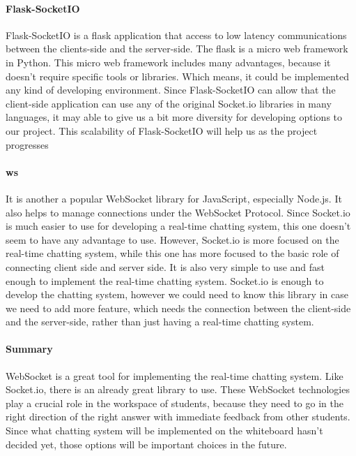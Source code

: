 \documentclass[10pt]{article}
\begin{document}
            \paragraph{Flask-SocketIO }
                Flask-SocketIO is a flask application that access to low latency communications between the clients-side and the server-side. The flask is a micro web framework in Python. This micro web framework includes many advantages, because it doesn’t require specific tools or libraries. Which means, it could be implemented any kind of developing environment. Since Flask-SocketIO can allow that the client-side application can use any of the original Socket.io libraries in many languages, it may able to give us a bit more diversity for developing options to our project. This scalability of Flask-SocketIO will help us as the project progresses \cite{fs}
            
            \paragraph{ws}
                It is another a popular WebSocket library for JavaScript, especially Node.js. It also helps to manage connections under the WebSocket Protocol. Since Socket.io is much easier to use for developing a real-time chatting system, this one doesn’t seem to have any advantage to use. However, Socket.io is more focused on the real-time chatting system, while this one has more focused to the basic role of connecting client side and server side. It is also very simple to use and fast enough to implement the real-time chatting system. Socket.io is enough to develop the chatting system, however we could need to know this library in case we need to add more feature, which needs the connection between the client-side and the server-side, rather than just having a real-time chatting system. \cite{ws}
            
            \paragraph{Summary}
                WebSocket is a great tool for implementing the real-time chatting system. Like Socket.io, there is an already great library to use.  These WebSocket technologies play a crucial role in the workspace of students, because they need to go in the right direction of the right answer with immediate feedback from other students. Since what chatting system will be implemented on the whiteboard hasn’t decided yet, those options will be important choices in the future.
\end{document}
